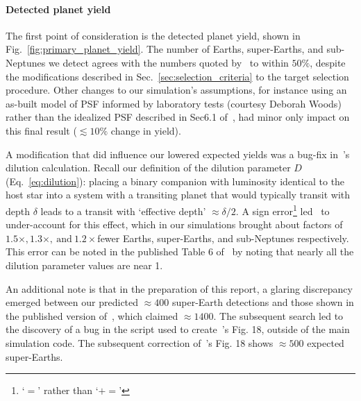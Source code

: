 \paragraph{Detected planet yield}
The first point of consideration is the detected planet yield, shown in Fig.~\ref{fig:primary_planet_yield}.
The number of Earths, super-Earths, and sub-Neptunes we detect agrees with the numbers quoted by~ to within $50\%$, despite the modifications described in Sec.~\ref{sec:selection_criteria} to the target selection procedure.
Other changes to our simulation's assumptions, for instance using an as-built model of \tesss PSF informed by laboratory tests (courtesy Deborah Woods) rather than the idealized PSF described in Sec6.1 of~, had minor only impact on this final result ($\lesssim 10\%$ change in yield).

A modification that did influence our lowered expected yields was a bug-fix in~'s dilution calculation. Recall our definition of the dilution parameter $D$ (Eq.~\ref{eq:dilution}): placing a binary companion with luminosity identical to the host star into a system with a transiting planet that would typically transit with depth $\delta$ leads to a transit with `effective depth' $\approx \delta/2$. A sign error\footnote{`$=$' rather than `$+=$'} led~ to under-account for this effect, which in our simulations brought about factors of $1.5\times, 1.3\times,\ \mathrm{and}\ 1.2\times$fewer Earths, super-Earths, and sub-Neptunes respectively. This error can be noted in the published Table 6 of~ by noting that nearly all the dilution parameter values are near 1.

An additional note is that in the preparation of this report, a glaring discrepancy emerged between our predicted $\approx 400$ super-Earth detections and those shown in the published version of~, which claimed $\approx 1400$. The subsequent search led to the discovery of a bug in the script used to create~'s Fig. 18, outside of the main simulation code. The subsequent correction of~'s Fig. 18 shows $\approx 500$ expected super-Earths.


